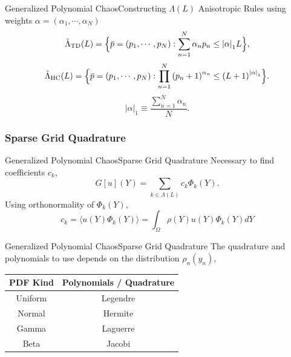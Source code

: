 \documentclass{beamer}
\begin{document}
\begin{frame}{Generalized Polynomial Chaos}{Constructing $\Lambda(L)$}%
  Anisotropic Rules using weights $\alpha = (\alpha_1,\cdots,\alpha_N)$
  \begin{equation*}
    \tilde\Lambda_\text{TD}(L)=\Big\{\bar p=(p_1,\cdots,p_N):\sum_{n=1}^N \alpha_n p_n \leq \qty|\alpha|_1 L
  \Big\},
  \end{equation*}
  \begin{equation*}
    \tilde\Lambda_\text{HC}(L)=\Big\{\bar p=(p_1,\cdots,p_N):\prod_{n=1}^N \qty(p_n+1)^{\alpha_n} \leq
    \qty(L+1)^{\qty|\alpha|_1} \Big\}.
  \end{equation*}
  \begin{equation*}
    |\alpha|_1 \equiv \frac{\sum_{n=1}^N \alpha_n}{N}.
  \end{equation*}
\end{frame}


\subsubsection{Sparse Grid Quadrature}
\begin{frame}{Generalized Polynomial Chaos}{Sparse Grid Quadrature}%
  Necessary to find coefficients $c_k$,
  \begin{equation*}
    G[u](Y) = \sum_{k\in\Lambda(L)} c_k \Phi_k(Y).
  \end{equation*}%
  Using orthonormality of $\Phi_k(Y)$,
  \begin{equation*}
    c_k = \langle u(Y)\Phi_k(Y) \rangle = \int_\Omega \rho(Y) u(Y)\Phi_k(Y) dY
  \end{equation*}
\end{frame}

\begin{frame}{Generalized Polynomial Chaos}{Sparse Grid Quadrature}%
  The quadrature and polynomials to use depends on the distribution $\rho_n(y_n)$,
  \begin{table}[h]
    \centering
    \begin{tabular}{c|c}
      PDF Kind & Polynomials / Quadrature \\ \hline
      Uniform & Legendre \\
      Normal  & Hermite  \\
      Gamma   & Laguerre \\
      Beta    & Jacobi   
    \end{tabular}
  \end{table}
\end{frame}
\end{document}
